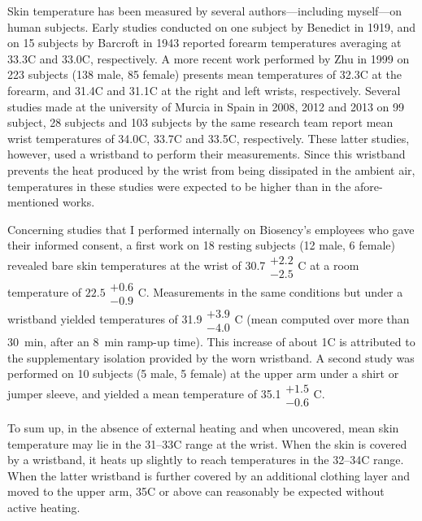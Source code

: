 Skin temperature has been measured by several authors---including myself---on human subjects. Early studies conducted on one subject by Benedict \etal{}\cite{benedict1919} in 1919, and on 15 subjects by Barcroft \etal{}\cite{barcroft1943} in 1943 reported forearm temperatures averaging at 33.3{\degree}C and 33.0{\degree}C, respectively. A more recent work performed by Zhu \etal{}\cite{zhu1999} in 1999 on 223 subjects (138 male, 85 female) presents mean temperatures of 32.3{\degree}C at the forearm, and 31.4{\degree}C and 31.1{\degree}C at the right and left wrists, respectively. Several studies made at the university of Murcia in Spain in  2008\cite{sarabia2008}, 2012\cite{blazquez2012} and 2013\cite{martinez2013} on 99 subject, 28 subjects and 103 subjects by the same research team report mean wrist temperatures of 34.0{\degree}C, 33.7{\degree}C and 33.5{\degree}C, respectively. These latter studies, however, used a wristband to perform their measurements. Since this wristband prevents the heat produced by the wrist from being dissipated in the ambient air, temperatures in these studies were expected to be higher than in the afore-mentioned works.

Concerning studies that I performed internally on Biosency's employees who gave their informed consent, a first work on 18 resting subjects (12 male, 6 female) revealed bare skin temperatures at the wrist of 30.7$\substack{+2.2 \\ -2.5}${\degree}C at a room temperature of $22.5\substack{+0.6 \\ -0.9}${\degree}C. Measurements in the same conditions but under a wristband yielded temperatures of 31.9$\substack{+3.9 \\ -4.0}${\degree}C (mean computed over more than 30~min, after an 8~min ramp-up time). This increase of about 1{\degree}C is attributed to the supplementary isolation provided by the worn wristband. A second study was performed on 10 subjects (5 male, 5 female) at the upper arm under a shirt or jumper sleeve, and yielded a mean temperature of 35.1$\substack{+1.5 \\ -0.6}${\degree}C.

To sum up, in the absence of external heating and when uncovered, mean skin temperature may lie in the 31--33{\degree}C range at the wrist. When the skin is covered by a wristband, it heats up slightly to reach temperatures in the 32--34{\degree}C range. When the latter wristband is further covered by an additional clothing layer and moved to the upper arm, 35{\degree}C or above can reasonably be expected without active heating.


